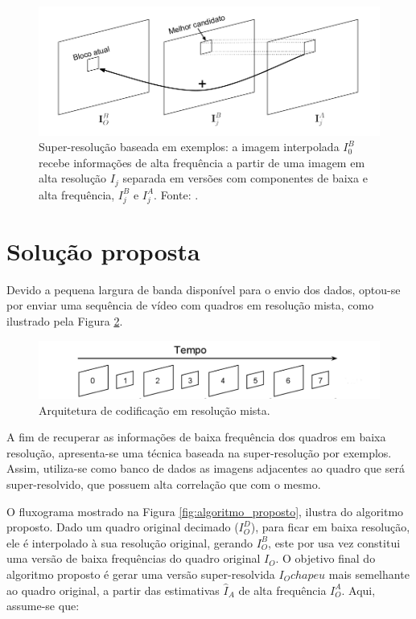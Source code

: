 \begin{figure}[h]
	\centering
	\includegraphics[scale=0.50]{figuras/superresolucao_4.png}
	\caption{Super-resolução baseada em exemplos: a imagem interpolada $I_0^B$ recebe informações de alta frequência a partir de uma imagem em alta resolução $I_j$ separada em versões com componentes de baixa e alta frequência, $I_j^B$ e $I_j^A$. Fonte: \cite{garcia2013tecnicas}.}

	\label{fig:SR_4}
\end{figure}

\section{Solução proposta}

Devido a pequena largura de banda disponível para o envio dos dados, optou-se por enviar uma sequência de vídeo com quadros em resolução mista, como ilustrado pela Figura \ref{fig:resolucao_mista}. 

\begin{figure}[h]
	\centering
	\includegraphics[scale=0.45]{figuras/resolucao_mista.png}
	\caption{ Arquitetura de codificação em resolução mista.}

	\label{fig:resolucao_mista}
\end{figure}

A fim de recuperar as informações de baixa frequência dos quadros em baixa resolução, apresenta-se uma técnica baseada na super-resolução por exemplos. Assim, utiliza-se como banco de dados as imagens adjacentes ao quadro que será super-resolvido, que possuem alta correlação que com o mesmo.

O fluxograma mostrado na Figura \ref{fig:algoritmo_proposto}, ilustra do algoritmo proposto. Dado um quadro original  decimado ($I_O^D$),  para ficar em baixa resolução, ele é interpolado à sua resolução original,  gerando $I_O^B$, este por usa vez constitui uma versão de baixa frequências do quadro original $I_O$. O objetivo final do algoritmo proposto é gerar uma versão super-resolvida  $I_O chapeu$ mais semelhante ao quadro original, a partir das estimativas $\widehat{I}_A$ de alta frequência $I_O^A$. Aqui, assume-se que:

